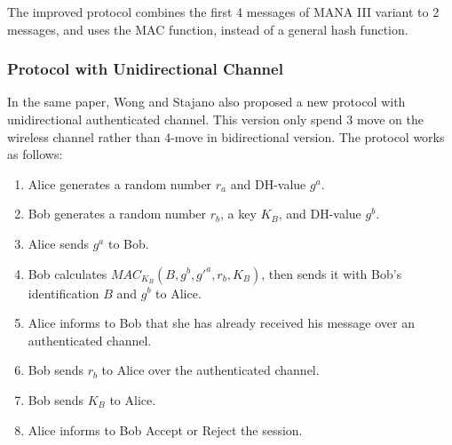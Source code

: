 The improved protocol combines the first 4 messages of MANA III variant to 2 messages, and uses the MAC function, instead of a general hash function. 
 
\subsubsection*{Protocol with Unidirectional Channel}

In the same paper, Wong and Stajano also proposed a new protocol with unidirectional authenticated channel. This version only spend 3 move on the wireless channel rather than 4-move in bidirectional version. The protocol works as follows:
\begin{enumerate}
\item Alice generates a random number $r_a$ and DH-value $g^a$.
\item Bob generates a random number $r_b$, a key $K_B$, and DH-value $g^b$.
\item Alice sends $g^a$ to Bob. 
\item Bob calculates $MAC_{K_B}(B,g^b,g'^a,r_b,K_B)$, then sends it with Bob's identification $B$ and $g^b$ to Alice.
\item Alice informs to Bob that she has already received his message over an authenticated channel. 
\item Bob sends $r_b$ to Alice over the authenticated channel. 
\item Bob sends $K_B$ to Alice. 
\item Alice informs to Bob Accept or Reject the session.
\end{enumerate}

